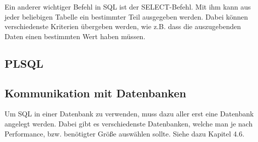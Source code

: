 Ein anderer wichtiger Befehl in SQL ist der SELECT-Befehl. Mit ihm kann aus jeder beliebigen Tabelle ein bestimmter Teil ausgegeben werden. Dabei können verschiedenste Kriterien übergeben werden, wie z.B. dass die auszugebenden Daten einen bestimmten Wert haben müssen.
 
\subsection{PLSQL}
 
\subsection{Kommunikation mit Datenbanken}
Um SQL in einer Datenbank zu verwenden, muss dazu aller erst eine Datenbank angelegt werden. Dabei gibt es verschiedenste Datenbanken, welche man je nach Performance, bzw. benötigter Größe auswählen sollte. Siehe dazu Kapitel 4.6.
 
 
